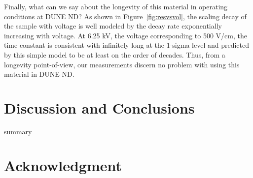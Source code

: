 \documentclass[a4paper,12pt]{article}
\begin{document}

Finally, what can we say about the longevity of this material in operating conditions at DUNE ND?
As shown in Figure~\ref{fig:resvsvol}, the scaling decay of the sample with voltage is well modeled by the  decay rate exponentially increasing with voltage. At 6.25 kV, the voltage corresponding to 500 V/cm, the time constant is consistent with infinitely long at the 1-sigma level and predicted by this simple model to be at least on the order of decades. Thus, from a longevity point-of-view, our measurements discern no problem with using this material in DUNE-ND.


\section{Discussion and Conclusions}
\label{sec:sum}


summary

\section{Acknowledgment} 



\clearpage


\end{document}
